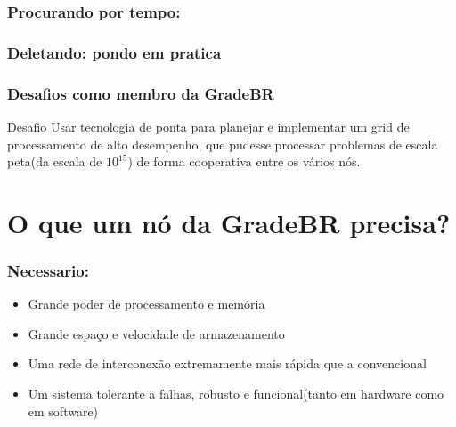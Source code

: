 \documentclass[10pt]{beamer}
\begin{document}
		\begin{frame}%
		\frametitle{Procurando por tempo:}
			
		\end{frame}

		\begin{frame}%
		\frametitle{Deletando: pondo em pratica}
			
		\end{frame}


		\begin{frame}%
		\frametitle{Desafios como membro da GradeBR}
			\begin{block}{Desafio}
				Usar tecnologia de ponta para planejar e implementar um grid de processamento de alto desempenho, que pudesse processar problemas de escala peta(da escala de $10^{15}$) de forma cooperativa entre os vários nós.
			\end{block}
		\end{frame}

\section{O que um nó da GradeBR precisa?}
		\begin{frame}%
		\frametitle{Necessario:}
			\begin{itemize}%
				\item Grande poder de processamento e memória
				\item Grande espaço e velocidade de armazenamento
				\item Uma rede de interconexão extremamente mais rápida que a convencional
				\item Um sistema tolerante a falhas, robusto e funcional(tanto em hardware como em software)
			\end{itemize}
		\end{frame}
\end{document}
